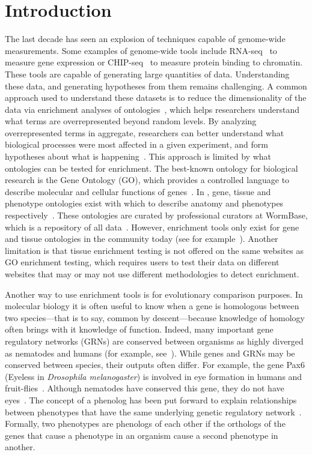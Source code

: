 \section*{Introduction}
The last decade has seen an explosion of techniques capable of genome-wide
measurements. Some examples of genome-wide tools include
RNA-seq~\citep{Mortazavi2008} to measure gene expression or
CHIP-seq~\citep{Johnson2007} to measure protein binding to chromatin. These tools are capable
of generating large quantities of data. Understanding these data, and generating
hypotheses from them remains challenging. A common approach used to understand
these datasets is to reduce the dimensionality of the data via enrichment
analyses of ontologies~\citep{TheGeneOntologyConsortium2000a}, which helps
researchers understand what terms are
overrepresented beyond random levels. By analyzing overrepresented terms in
aggregate, researchers can better understand what biological processes were most
affected in a given experiment, and form hypotheses about what is
happening~\citep{Rhee2008}.
This approach is limited by what ontologies can be tested for enrichment.
The best-known ontology for biological research is the Gene Ontology (GO), which
provides a controlled language to describe molecular and cellular functions of
genes~\citep{TheGeneOntologyConsortium2000a}.
In \cel{}, gene, tissue and phenotype ontologies exist
with which to describe \cel{} anatomy and phenotypes
respectively~\citep{Schindelman2011,Lee2003}. These ontologies are curated by
professional curators at WormBase, which is a repository of all \cel{}
data~\citep{Howe2016}.
However, enrichment tools
only exist for gene and tissue ontologies
in the community today (see for example~\citep{Chikina2009,Mi2013,Angeles-Albores2016}).
Another limitation is that
tissue enrichment testing is not offered on the same websites as GO enrichment
testing, which requires users to test their data on different websites that may
or may not use different methodologies to detect enrichment.

Another way to use enrichment tools is for evolutionary comparison purposes.
In molecular biology it is often useful to know when a gene is homologous
between two species---that is to say, common by descent---because knowledge of
homology often brings with it knowledge of function. Indeed, many
important gene regulatory networks (GRNs) are conserved between organisms as
highly diverged as nematodes and humans (for example, see~\citep{Sternberg1998}).
While genes and GRNs may be conserved between species, their outputs often differ.
For example, the gene Pax6 (Eyeless in \emph{Drosophila melanogaster})
is involved in eye formation in humans and fruit-flies~\citep{Quiring1994}. Although
nematodes have conserved this gene, they do not have eyes~\citep{Zhang1995,Chisholm1995}.
The concept of a phenolog has been put forward to explain relationships between
phenotypes that have the same underlying genetic
regulatory network~\citep{McGary2010,Lehner2013}.
Formally, two phenotypes are phenologs of each other if the orthologs of the
genes that cause a phenotype in an organism cause a second phenotype in another.

